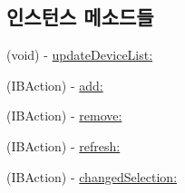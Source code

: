 \subsection*{인스턴스 메소드들}
\begin{DoxyCompactItemize}
\item 
(void) -\/ \hyperlink{interface_outline_view_controller_ae0fde79c58d30bdb92b065bda8e9eda7}{update\+Device\+List\+:}
\item 
(I\+B\+Action) -\/ \hyperlink{interface_outline_view_controller_a760d909508462c2fce590cc906b2c77c}{add\+:}
\item 
(I\+B\+Action) -\/ \hyperlink{interface_outline_view_controller_aa15aab45b7c52c88f09ead1801d2da53}{remove\+:}
\item 
(I\+B\+Action) -\/ \hyperlink{interface_outline_view_controller_aceda7436ce6fed1c886a08ac19621689}{refresh\+:}
\item 
(I\+B\+Action) -\/ \hyperlink{interface_outline_view_controller_ac06c003bf6f6212fe2c0148158f15420}{changed\+Selection\+:}
\end{DoxyCompactItemize}
